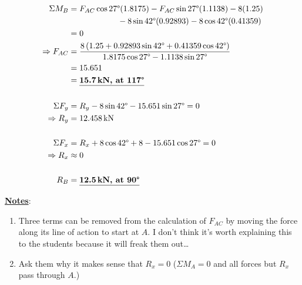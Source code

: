 \documentclass[10pt,oneside, professionalfonts, mathserif, noindent]{amsart}
\begin{document}
\large
\begin{align*}
	\Sigma M_B         & = F_{AC}\cos 27\degree(1.8175)-F_{AC}\sin 27\degree(1.1138)-8(1.25)                                                  \\
	                   & \qquad\qquad\qquad -8\sin 42\degree(0.92893)-8\cos 42\degree(0.41359)                                                \\
	                   & = 0                                                                                                                  \\
	\Rightarrow F_{AC} & = \frac{8\left(1.25+0.92893\sin 42\degree + 0.41359\cos 42\degree\right)}{1.8175\cos 27\degree-1.1138\sin 27\degree} \\
	&=15.651\\
	                   & = \underline{\bm{15.7\,\text{\bfseries  kN, at }117\degree }}                                                                                                  \\\\
	\Sigma F_y         & =R_y-8\sin 42\degree-15.651\sin 27\degree = 0                                                                        \\
	\Rightarrow R_y    & = 12.458\,\text{kN}                                                                                                  \\\\
	\Sigma F_x         & = R_x+8\cos 42\degree + 8 -15.651\cos 27\degree=0                                                                     \\
	\Rightarrow R_x    & \approx 0\\\\
	R_B &= \underline{\bm{ 12.5\,\text{\bf kN, at }90\degree}}
\end{align*}

\parb
\underline{\bf Notes}:
\begin{enumerate}
	\item Three terms can be removed from the calculation of $F_{AC}$ by moving the force along its line of action to start at $A$. I don't think it's worth explaining this to the students because it will freak them out\ldots\parm
	\item Ask them why it makes sense that $R_x=0$ ($\Sigma M_A=0 $ and all forces but $R_x$ pass through $A$.)
\end{enumerate}
\end{document}
